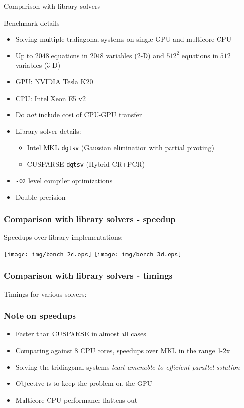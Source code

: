 \begin{frame}{Comparison with library solvers}
\footnotesize
\begin{block}{Benchmark details}
\begin{itemize}
\item Solving multiple tridiagonal systems on single GPU and multicore CPU
\item Up to $2048$ equations in $2048$ variables (2-D)
    and $512^2$ equations in $512$ variables (3-D)
\item GPU: NVIDIA Tesla K20
\item CPU: Intel Xeon E5 v2
\item Do \emph{not} include cost of CPU-GPU transfer
\item Library solver details:
\begin{itemize}
    \footnotesize
    \item Intel MKL \texttt{dgtsv} (Gaussian elimination with partial pivoting)
    \item CUSPARSE \texttt{dgtsv} (Hybrid CR+PCR)
\end{itemize}
\item \texttt{-02} level compiler optimizations
\item Double precision
\end{itemize}
\end{block}
\end{frame}

\begin{frame}
\frametitle{Comparison with library solvers - speedup}
Speedups over library implementations:
\begin{center}
\texttt{[image: img/bench-2d.eps]}
\texttt{[image: img/bench-3d.eps]}
\end{center}
\end{frame}

\begin{frame}
\frametitle{Comparison with library solvers - timings}
Timings for various solvers:
\begin{table}
\resizebox{\textwidth}{!}{%

}
\end{table}
\end{frame}

\begin{frame}
\frametitle{Note on speedups}
\begin{itemize}
\item Faster than CUSPARSE in almost all cases
\item Comparing against 8 CPU cores,
    speedups over MKL in the range 1-2x
\item Solving the tridiagonal systems
    \emph{least amenable to efficient parallel solution}
\item Objective is to keep the problem on the GPU
\item Multicore CPU performance flattens out
\end{itemize}
\end{frame}

